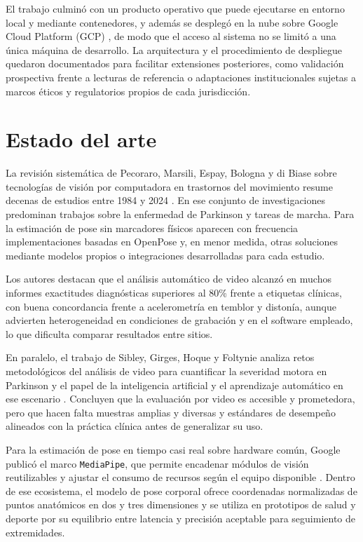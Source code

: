 El trabajo culminó con un producto operativo que puede ejecutarse en entorno local y mediante contenedores, y además se desplegó en la nube sobre Google Cloud Platform (GCP) \citep{gcp}, de modo que el acceso al sistema no se limitó a una única máquina de desarrollo. La arquitectura y el procedimiento de despliegue quedaron documentados para facilitar extensiones posteriores, como validación prospectiva frente a lecturas de referencia o adaptaciones institucionales sujetas a marcos éticos y regulatorios propios de cada jurisdicción.

\section{Estado del arte}

La revisión sistemática de Pecoraro, Marsili, Espay, Bologna y di Biase sobre tecnologías de visión por computadora en trastornos del movimiento resume decenas de estudios entre 1984 y 2024 \citep{pecoraro2025computer}. En ese conjunto de investigaciones predominan trabajos sobre la enfermedad de Parkinson y tareas de marcha. Para la estimación de pose sin marcadores físicos aparecen con frecuencia implementaciones basadas en OpenPose \citep{cao2019openpose} y, en menor medida, otras soluciones mediante modelos propios o integraciones desarrolladas para cada estudio.

Los autores destacan que el análisis automático de video alcanzó en muchos informes exactitudes diagnósticas superiores al 80\% frente a etiquetas clínicas, con buena concordancia frente a acelerometría en temblor y distonía, aunque advierten heterogeneidad en condiciones de grabación y en el software empleado, lo que dificulta comparar resultados entre sitios.

En paralelo, el trabajo de Sibley, Girges, Hoque y Foltynie analiza retos metodológicos del análisis de video para cuantificar la severidad motora en Parkinson y el papel de la inteligencia artificial y el aprendizaje automático en ese escenario \citep{sibley2021video}. Concluyen que la evaluación por video es accesible y prometedora, pero que hacen falta muestras amplias y diversas y estándares de desempeño alineados con la práctica clínica antes de generalizar su uso.

Para la estimación de pose en tiempo casi real sobre hardware común, Google publicó el marco \texttt{MediaPipe}, que permite encadenar módulos de visión reutilizables y ajustar el consumo de recursos según el equipo disponible \citep{lugaresi2019mediapipe}. Dentro de ese ecosistema, el modelo de pose corporal ofrece coordenadas normalizadas de puntos anatómicos en dos y tres dimensiones y se utiliza en prototipos de salud y deporte por su equilibrio entre latencia y precisión aceptable para seguimiento de extremidades.

